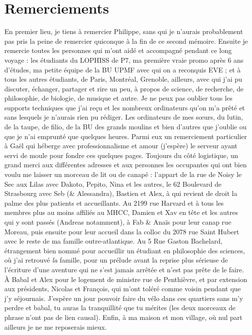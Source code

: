 \section*{Remerciements}
{\footnotesize
En premier lieu, je tiens à remercier Philippe, sans qui je n'aurais probablement pas pris la peine de remercier quiconque à la fin de ce second mémoire. Ensuite je remercie toutes les personnes qui m'ont aidé et accompagné pendant ce long voyage : les étudiants du LOPHISS de P7, ma première vraie promo après 6 ans d'études, ma petite équipe de la BU UPMF avec qui on a reconquis EVE ; et à tous les autres étudiants, de Paris, Montréal, Grenoble, ailleurs, avec qui j'ai pu discuter, échanger, partager et rire un peu, à propos de science, de recherche, de philosophie, de biologie, de musique et autre.
Je ne peux pas oublier tous les supports techniques que j'ai reçu et les nombreux ordinateurs qu'on m'a prêté et sans lesquels je n'aurais rien pu rédiger. Les ordinateurs de mes sœurs, du lutin, de la taupe, de filio, de la BU des grands moulins et bien d'autres que j'oublie ou que je n'ai emprunté que quelques heures. Parmi eux un remerciement particulier à Gaël qui héberge avec professionnalisme et amour (j'espère) le serveur ayant servi de moule pour fondre ces quelques pages. Toujours du côté logistique, un grand merci aux différentes adresses et aux personnes les occupantes qui ont bien voulu me laisser un morceau de lit ou de canapé : l'appart de la rue de Noisy le Sec aux Lilas avec Dakoto, Pepito, Nina et les autres, le 62 Boulevard de Strasbourg avec Seb (\& Alessandra), Bastien et Alex, à qui revient de droit la palme des plus patients et accueillants. Au 2199 rue Harvard et à tous les membres plus au moins affiliés au MHCC, Damien et Xav en tête et les autres qui y sont passés (Andreas notamment), à Fab \& Anaïs pour leur canap rue Moreau, puis ensuite pour leur accueil dans la colloc du 2078 rue Saint Hubert avec le reste de ma famille outre-atlantique. Au 5 Rue Gaston Bachelard, étrangement bien nommé pour accueillir un étudiant en philosophie des sciences, où j'ai retrouvé \emph{la} famille, pour un prélude avant la reprise plus sérieuse de l'écriture d'une aventure qui ne s'est jamais arrêtée et n'est pas prête de le faire. \`A Babal et Alex pour le logement de ministre rue de Penthièvre, et par extension aux présidents, Nicolas et François, qui m'ont toléré comme voisin pendant que j'y séjournais. J'espère un jour pouvoir faire du vélo dans ces quartiers sans m'y perdre et babal, tu auras la tranquillité que tu mérites (les deux morceaux de phrase n'ont pas de lien causal). 
Enfin, à ma maison et mon village, où nul part ailleurs je ne me reposerais mieux.


}
